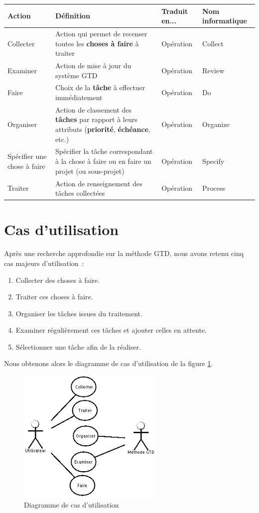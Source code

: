 \begin{tabular}{|p{1.7cm}|p{6cm}|p{1.7cm}|p{1.7cm}|}
\hline
\textbf{Action} & \textbf{Définition} & \textbf{Traduit en...} & \textbf{Nom informatique} \\
\hline
Collecter & Action qui permet de recenser toutes les \textbf{choses à faire} à traiter & Opération & Collect \\
\hline
Examiner & Action de mise à jour du système GTD & Opération & Review \\
\hline
Faire & Choix de la \textbf{tâche} à effectuer immédiatement & Opération & Do \\
\hline
Organiser & Action de classement des \textbf{tâches} par rapport à leurs attributs (\textbf{priorité}, \textbf{échéance}, etc.) & Opération & Organize \\
\hline
Spécifier une chose à faire & Spécifier la tâche correspondant à la chose à faire ou en faire un projet (ou sous-projet) & Opération & Specify \\
\hline
Traiter & Action de renseignement des tâches collectées & Opération & Process \\
\hline
\end{tabular}


\section{Cas d'utilisation}

Après une recherche approfondie sur la méthode GTD, nous avons retenu cinq cas majeurs d'utilisation~:
\begin{enumerate}
\item Collecter des choses à faire.
\item Traiter ces choses à faire.
\item Organiser les tâches issues du traitement.
\item Examiner régulièrement ces tâches et ajouter celles en attente.
\item Sélectionner une tâche afin de la réaliser.
\end{enumerate}

Nous obtenons alors le diagramme de cas d'utilisation de la figure \ref{usecase}.

\begin{figure}[!ht]
\begin{center}
\includegraphics[width=7cm]{images/usecase.png}
\caption{Diagramme de cas d'utilisation}
\label{usecase}
\end{center}
\end{figure}

